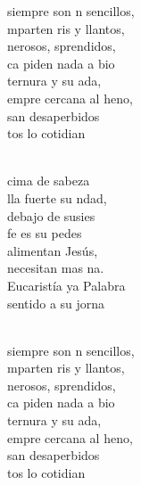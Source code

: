 \begin{cancion}
	\begin{chorus}%
	siempre son n sencillos,\\
	mparten ris y llantos,\\
	nerosos, sprendidos,\\
	ca piden nada a bio\\
	 ternura y su ada,\\
	empre cercana al heno,\\
	san desaperbidos\\
	tos lo cotidian\\
	\end{chorus}%
	\jump\\
	cima de sabeza\\
	lla fuerte su ndad,\\
	debajo de susies\\
	fe es su pedes\\
	 alimentan Jesús,\\
	 necesitan mas na.\\
	 Eucaristía ya Palabra\\
	 sentido a su jorna\\\jump\\
	\begin{chorus}%
	siempre son n sencillos,\\
	mparten ris y llantos,\\
	nerosos, sprendidos,\\
	ca piden nada a bio\\
	 ternura y su ada,\\
	empre cercana al heno,\\
	san desaperbidos\\
	tos lo cotidian\\
	\end{chorus}%
	\jump\\
\end{cancion}%
